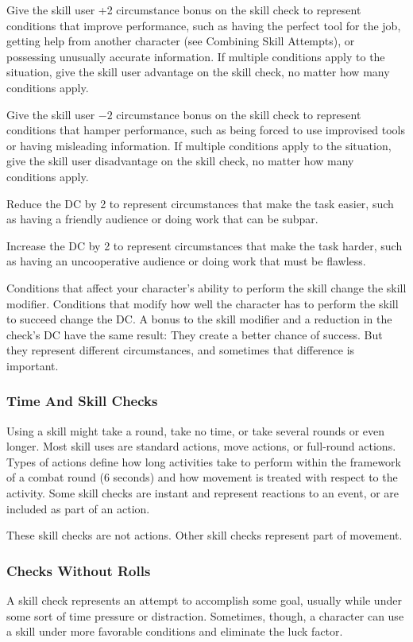 \begin{enumerate*}
\item Give the skill user +2 circumstance bonus on the skill check to represent conditions that improve performance, such as having the perfect tool for the job, getting help from another character (see Combining Skill Attempts), or possessing unusually accurate information. If multiple conditions apply to the situation, give the skill user advantage on the skill check, no matter how many conditions apply.
\item Give the skill user $-2$ circumstance bonus on the skill check to represent conditions that hamper performance, such as being forced to use improvised tools or having misleading information. If multiple conditions apply to the situation, give the skill user disadvantage on the skill check, no matter how many conditions apply.
\item Reduce the DC by 2 to represent circumstances that make the task easier, such as having a friendly audience or doing work that can be subpar.
\item Increase the DC by 2 to represent circumstances that make the task harder, such as having an uncooperative audience or doing work that must be flawless.
\end{enumerate*}
Conditions that affect your character's ability to perform the skill change the skill modifier. Conditions that modify how well the character has to perform the skill to succeed change the DC. A bonus to the skill modifier and a reduction in the check's DC have the same result: They create a better chance of success. But they represent different circumstances, and sometimes that difference is important.

\subsubsection{Time And Skill Checks}
Using a skill might take a round, take no time, or take several rounds or even longer. Most skill uses are standard actions, move actions, or full-round actions. Types of actions define how long activities take to perform within the framework of a combat round (6 seconds) and how movement is treated with respect to the activity. Some skill checks are instant and represent reactions to an event, or are included as part of an action.

These skill checks are not actions. Other skill checks represent part of movement.

\subsubsection{Checks Without Rolls}
A skill check represents an attempt to accomplish some goal, usually while under some sort of time pressure or distraction. Sometimes, though, a character can use a skill under more favorable conditions and eliminate the luck factor.

